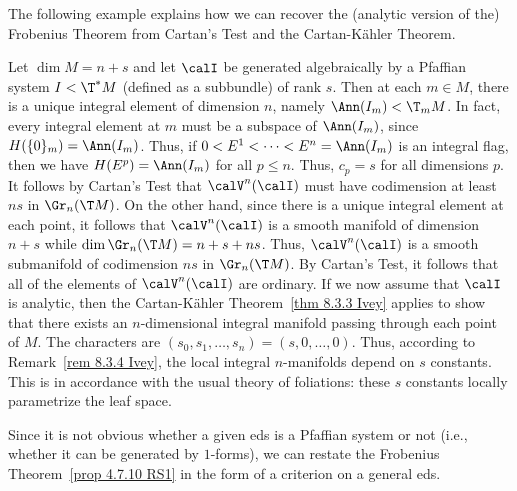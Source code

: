 The following example explains how we can recover the (analytic version of the) Frobenius Theorem from Cartan's Test and the Cartan-K\"ahler Theorem.

\begin{example}
    Let $\dim M=n+s$ and let $\calI$ be generated algebraically by a Pfaffian system $I<\T^\ast M$ (defined as a subbundle) of rank $s$. Then at each $m\in M$, there is a unique integral element of dimension $n$, namely $\Ann(I_m)<\T_m M$. In fact, every integral element at $m$ must be a subspace of $\Ann(I_m)$, since $H(\{0\}_m)=\Ann(I_m)$. Thus, if $0<E^1<\cdots<E^n=\Ann(I_m)$ is an integral flag, then we have $H(E^p)=\Ann(I_m)$ for all $p\leq n$. Thus, $c_p=s$ for all dimensions $p$. It follows by Cartan's Test that $\calV^n(\calI)$ must have codimension at least $ns$ in $\Gr_n(\T M)$. On the other hand, since there is a unique integral element at each point, it follows that $\calV^n(\calI)$ is a smooth manifold of dimension $n+s$ while $\dim\Gr_n(\T M)=n+s+ns$. Thus, $\calV^n(\calI)$ is a smooth submanifold of codimension $ns$ in $\Gr_n(\T M)$. By Cartan's Test, it follows that all of the elements of $\calV^n(\calI)$ are ordinary. If we now assume that $\calI$ is analytic, then the Cartan-K\"ahler Theorem~\ref{thm 8.3.3 Ivey} applies to show that there exists an $n$-dimensional integral manifold passing through each point of $M$. The characters are $(s_0,s_1,\ldots,s_n)=(s,0,\ldots,0)$. Thus, according to Remark~\ref{rem 8.3.4 Ivey}, the local integral $n$-manifolds depend on $s$ constants. This is in accordance with the usual theory of foliations: these $s$ constants locally parametrize the leaf space.
\end{example}

Since it is not obvious whether a given \gls{eds} is a Pfaffian system or not (i.e., whether it can be generated by $1$-forms), we can restate the Frobenius Theorem~\ref{prop 4.7.10 RS1} in the form of a criterion on a general \gls{eds}.

